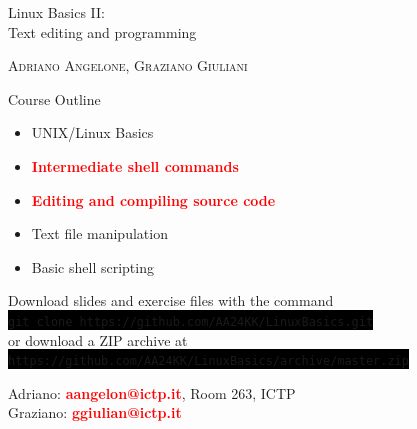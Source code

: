 \documentclass[unknownkeysallowed, 10pt, a4 paper, handout]{beamer}
\newcommand{\focus}[1]{\textbf{\textcolor{red}{#1}}}
\newcommand{\code}[1]{\colorbox{black}{\color{green}\texttt{#1}}}
\begin{document}
\begin{frame}
  \begin{center}


    \begin{block}{}
      \Large
      \centering
      Linux Basics II:\\
      Text editing and programming
    \end{block}

    \vspace{6mm}
    \large
    \textsc{Adriano Angelone, Graziano Giuliani} \\

  \end{center}
\end{frame}

\begin{frame}[label=outline]{Course Outline}
  \begin{itemize}
    \item UNIX/Linux Basics
    \item \focus{Intermediate shell commands}
    \item \focus{Editing and compiling source code}
    \item Text file manipulation
    \item Basic shell scripting
  \end{itemize}

  \vspace{6mm}

  \centering
  Download slides and exercise files with the command\\
  \code{git clone https://github.com/AA24KK/LinuxBasics.git}\\
  \vspace{1mm}
  or download a ZIP archive at
  \vspace{1mm}
  \code{https://github.com/AA24KK/LinuxBasics/archive/master.zip}

  \vspace{2mm}

  Adriano: \focus{aangelon@ictp.it}, Room 263, ICTP\\
  Graziano: \focus{ggiulian@ictp.it}

\end{frame}
\end{document}
